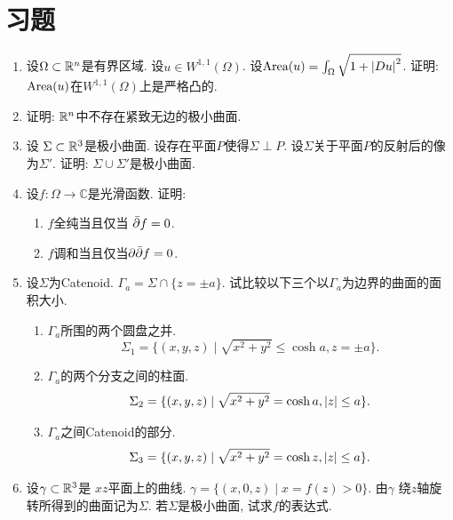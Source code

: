 \section{习题}
\begin{enumerate}
    \item 设$\Omega\subset \mathbb{R}^n$是有界区域. 设$u \in W^{1,1}(\Omega)$.  设$\text{Area}(u)=\int_\Omega \sqrt{1+\left | Du \right |^2}$. 证明: $\text{Area}(u)$在$W^{1,1}(\Omega)$上是严格凸的.
    \item 证明: $\mathbb{R}^n$中不存在紧致无边的极小曲面.
    \item 设 $\Sigma \subset \mathbb{R}^3$是极小曲面. 设存在平面$P$使得$\Sigma \perp P$. 设$\Sigma$关于平面$P$的反射后的像为$\Sigma'$. 证明: $\Sigma \cup \Sigma'$是极小曲面.
    \item 设$f: \Omega \to \mathbb{C}$是光滑函数. 证明:
    \begin{enumerate}
        \item $f$全纯当且仅当 ${\bar{\partial}} f=0$.
        \item $f$调和当且仅当$\partial {\bar{\partial}} f=0$.
    \end{enumerate}
    \item 设$\Sigma$为Catenoid. $\Gamma_a=\Sigma \cap \{z=\pm a\}$. 试比较以下三个以$\Gamma_a$为边界的曲面的面积大小.
    \begin{enumerate}
        \item $\Gamma_a$所围的两个圆盘之并.  
        \begin{equation*}
            \Sigma_1=\{(x,y,z)\mid \sqrt{x^2+y^2} \le \cosh a, z=\pm a\}.
        \end{equation*}
        \item $\Gamma_a$的两个分支之间的柱面. 
        \begin{equation*}
            \Sigma_2=\{(x,y,z)\mid \sqrt{x^2+y^2} = \cosh a, \left | z \right | \le a\}.
        \end{equation*}
        \item $\Gamma_a$之间Catenoid的部分. 
        \begin{equation*}
            \Sigma_3=\{(x,y,z)\mid  \sqrt{x^2+y^2}=\cosh z, \left | z \right | \le a \}.
        \end{equation*}
    \end{enumerate}
    \item 设$\gamma\subset \mathbb{R}^3$是 $xz$平面上的曲线. $\gamma= \{(x,0,z)\mid x=f(z) >0 \}$. 由$\gamma$ 绕$z$轴旋转所得到的曲面记为$\Sigma$. 若$\Sigma$是极小曲面, 试求$f$的表达式.
\end{enumerate}
